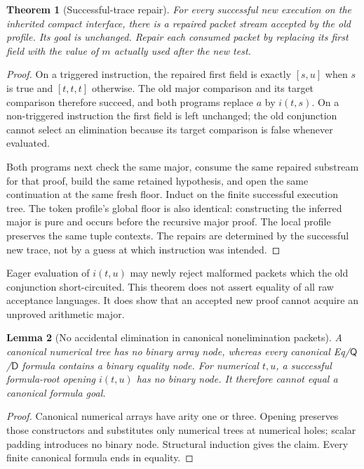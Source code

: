 \documentclass[11pt]{article}
\newtheorem{theorem}{Theorem}[section]
\newtheorem{lemma}[theorem]{Lemma}
\theoremstyle{definition}
\theoremstyle{remark}
\newcommand{\D}{\mathsf D}
\newcommand{\Q}{\mathsf Q}
\begin{document}
\begin{theorem}[Successful-trace repair]
For every successful new execution on the inherited compact interface,
there is a repaired packet stream accepted by the old profile.  Its goal
is unchanged.  Repair each consumed packet by replacing its first field
with the value of $m$ actually used after the new test.
\end{theorem}
\begin{proof}
On a triggered instruction, the repaired first field is exactly
$[s,u]$ when $s$ is true and $[t,t,t]$ otherwise.  The old major comparison
and its target comparison therefore succeed, and both programs replace
$a$ by $i(t,s)$.  On a non-triggered instruction the first field is left
unchanged; the old conjunction cannot select an elimination because its
target comparison is false whenever evaluated.

Both programs next check the same major, consume the same repaired
substream for that proof, build the same retained hypothesis, and open
the same continuation at the same fresh floor.  Induct on the finite
successful execution tree.  The token profile's global floor is also
identical: constructing the inferred major is pure and occurs before
the recursive major proof.  The local profile preserves the same tuple
contexts.  The repairs are determined by the successful new trace, not
by a guess at which instruction was intended.
\end{proof}

Eager evaluation of $i(t,u)$ may newly reject malformed packets which the
old conjunction short-circuited.  This theorem does not assert equality of
all raw acceptance languages.  It does show that an accepted new proof
cannot acquire an unproved arithmetic major.

\begin{lemma}[No accidental elimination in canonical nonelimination packets]
A canonical numerical tree has no binary array node, whereas every
canonical Eq/$\Q$/$\D$ formula contains a binary equality node.
For numerical $t,u$, a successful formula-root opening $i(t,u)$ has no
binary node.  It therefore cannot equal a canonical formula goal.
\end{lemma}
\begin{proof}
Canonical numerical arrays have arity one or three.  Opening preserves
those constructors and substitutes only numerical trees at numerical
holes; scalar padding introduces no binary node.  Structural induction
gives the claim.  Every finite canonical formula ends in equality.
\end{proof}
\end{document}
